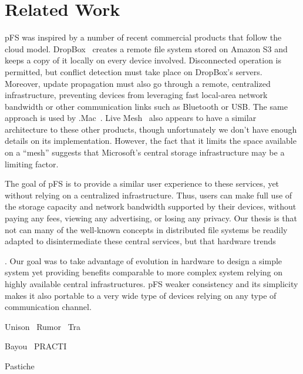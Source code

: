
\section{Related Work}


pFS was inspired by a number of recent commercial products that follow
the cloud model.  DropBox~\cite{houston:dropbox} creates a remote file
system stored on Amazon S3 and keeps a copy of it locally on every
device involved.  Disconnected operation is permitted, but conflict
detection must take place on DropBox's servers.  Moreover, update
propagation must also go through a remote, centralized infrastructure,
preventing devices from leveraging fast local-area network bandwidth
or other communication links such as Bluetooth or USB\@.  The same
approach is used by .Mac~\cite{apple:mac}.  Live
Mesh~\cite{microsoft:livemesh} also appears to have a similar
architecture to these other products, though unfortunately we don't
have enough details on its implementation.  However, the fact that it
limits the space available on a ``mesh'' suggests that Microsoft's
central storage infrastructure may be a limiting factor.

The goal of pFS is to provide a similar user experience to these
services, yet without relying on a centralized infrastructure.  Thus,
users can make full use of the storage capacity and network bandwidth
supported by their devices, without paying any fees, viewing any
advertising, or losing any privacy.  Our thesis is that not can many
of the well-known concepts in distributed file systems be readily
adapted to disintermediate these central services, but that hardware
trends


. Our
goal was to take advantage of evolution in hardware to design a simple
system yet providing benefits comparable to more complex system
relying on highly available central infrastructures. pFS weaker
consistency and its simplicity makes it also portable to a very wide
type of devices relying on any type of communication channel.


Unison~\cite{balasubramanian:unison}
Rumor~\cite{guy:rumor}
Tra~\cite{cox:tra}

Bayou~\cite{petersen:flexible-update}
PRACTI~\cite{belaramani:pract}

Pastiche~\cite{cox:pastiche,nguyen:friendstore}


